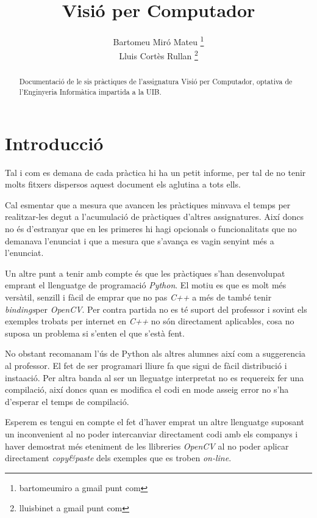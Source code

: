 \documentclass[a4paper,11pt]{scrartcl}
\title{Visió per Computador}
\author{ Bartomeu Miró Mateu \thanks{bartomeumiro a gmail punt com} \\
	 Lluis Cortès Rullan \thanks{lluisbinet a gmail punt com} }
\begin{document}
  \maketitle

  \begin{abstract}
    Documentació de le sis pràctiques de l'assignatura Visió per Computador,
optativa de l'Enginyeria Informàtica impartida a la UIB.

  \end{abstract}

  \newpage
  \setcounter{page}{2}
  \tableofcontents
  \newpage

  \section{Introducció}
  Tal i com es demana de cada pràctica hi ha un petit informe, per tal de no tenir
molts fitxers dispersos aquest document els aglutina a tots ells.

  Cal esmentar que a mesura que avancen les pràctiques minvava el temps
per realitzar-les degut a l'acumulació de pràctiques d'altres assignatures.
  Així doncs no és d'estranyar que en les primeres hi hagi opcionals o funcionalitats
que no demanava l'enunciat i que a mesura que s'avança es vagin senyint més a l'enunciat.

  Un altre punt a tenir amb compte és que les pràctiques s'han desenvolupat emprant el
llenguatge de programació \emph{Python}. El motiu es que es molt més versàtil, senzill
i fàcil de emprar que no pas \emph{C++} a més de també tenir \emph{bindings}\footnotemark per \emph{OpenCV}.
Per contra partida no es té suport del professor
i sovint els exemples trobats per internet en \emph{C++} no són directament aplicables, 
cosa no suposa un problema si s'enten el que s'està fent.

No obstant recomanam l'ús de Python als altres alumnes així com a suggerencia al
professor. El fet de ser programari lliure fa que sigui de fàcil distribució i
insta\lgem ació. Per altra banda al ser un lleguatge interpretat no es requereix
fer una compilació, així doncs quan es modifica el codi en mode asseig error
no s'ha d'esperar el temps de compilació.

Esperem es tengui en compte el fet d'haver emprat un altre llenguatge suposant
un inconvenient al no poder intercanviar directament codi amb els companys i
haver demostrat més eteniment de les llibreries \emph{OpenCV} al no poder aplicar
directament \emph{copy\&paste} dels exemples que es troben \emph{on-line}.
\end{document}
